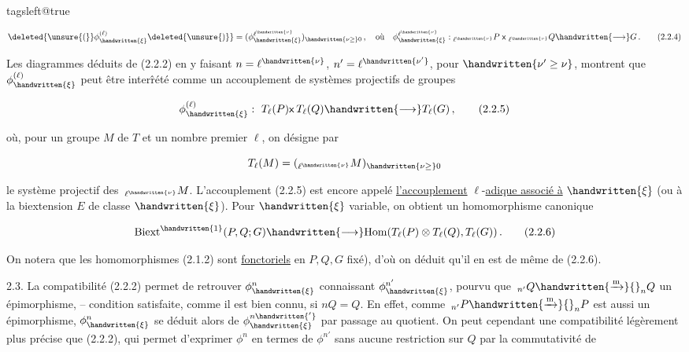 \begingroup\csname tagsleft@true\endcsname


\[\deleted{\unsure{(}}\phi_{\handwritten{\xi}}^{(\ell)}\deleted{\unsure{)}}=(\phi_{\handwritten{\xi}}^{\ell^{\handwritten{\nu}}})_{\handwritten{\nu\geq}0}\,,\quad\text{où}\quad \phi_{\handwritten{\xi}}^{\ell^{\handwritten{\nu}}}:{}_{\ell^{\handwritten{\nu}}}P\;\mathsf{x}\;{}_{\ell^{\handwritten{\nu}}}Q\handwritten{\longrightarrow}G\,.\tag*{(2.2.4)}\]

Les diagrammes déduits de (2.2.2) en y faisant $n=\ell^{\handwritten{\nu}}$, $n'=\ell^{\handwritten{\nu'}}$, pour $\handwritten{\nu'\geq\nu}$, montrent que $\phi_{\handwritten{\xi}}^{(\ell)}$ peut être interr̂été comme un accouplement de  systèmes projectifs de groupes

\[\phi_{\handwritten{\xi}}^{(\ell)}:\ T_\ell(P)\mathsf{x}\,T_\ell(Q)\handwritten{\longrightarrow}T_\ell(G)\,,\tag*{(2.2.5)}\]

où, pour un groupe $M$ de $T$ et un nombre premier $\ell$, on désigne par

\[T_\ell(M)=({}_{\ell^{\handwritten{\nu}}}M)_{\handwritten{\nu\geq}0}\]

le système p\deleted{\unsure{(}}rojectif des $\,{}_{\ell^{\handwritten{\nu}}}M$. L'accouplement  (2.2.5) est encore appelé \uline{l'accouplement} $\ell$-\uline{adique associé à} $\handwritten{\xi}$ (ou à la biextension $E$ de classe $\handwritten{\xi}$). Pour $\handwritten{\xi}$ variable, on obtient un homomorphisme canonique

\[\mathrm{Biext}^{\handwritten{1}}(P,Q;G)\handwritten{\longrightarrow}\mathrm{Hom}(T_\ell(P)\otimes T_\ell(Q),T_\ell(G))\,.\tag*{(2.2.6)}\]

On notera que les homomorphismes (2.1.2) sont \uline{fonctoriels} en $P,Q,G$  fixé), d'où on déduit qu'il en est de même de (2.2.6).

2.3.\qquad {} La compatibilité (2.2.2) permet de retrouver $\phi_{\handwritten{\xi}}^n$ connaissant $\phi_{\handwritten{\xi}}^{n'}$, pourvu que $\,{}_{n'}Q\handwritten{\xrightarrow{\mathrm m}}{}_nQ$  un épimorphisme, --  condition satisfaite, comme il est bien connu, si $nQ=Q$. En effet, comme $\,{}_{n'}P\handwritten{\xrightarrow{\mathrm m}}{}_nP$ est aussi un épimorphisme, $\phi_{\handwritten{\xi}}^n$ se déduit alors de $\phi_{\handwritten{\xi}}^{n\handwritten{'}}$ par passage au quotient. On peut cependant  une compatibilité légèrement plus précise que (2.2.2), qui permet d'exprimer $\phi^n$ en termes de $\phi^{n'}$ sans aucune restriction sur $Q$\handwritten{,} par la commutativité de

